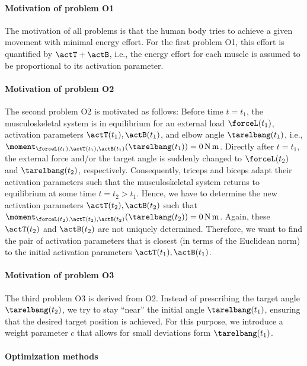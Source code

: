 \paragraph{Motivation of problem O1}

The motivation of all problems is that the human body tries to
achieve a given movement with minimal energy effort.
For the first problem O1, this effort is quantified by $\actT + \actB$,
i.e., the energy effort for each muscle is assumed to be proportional
to its activation parameter.

\paragraph{Motivation of problem O2}

The second problem O2 is motivated as follows:
Before time $t = t_1$, the musculoskeletal system is in equilibrium for
an external load $\forceL(t_1)$,
activation parameters $\actT(t_1), \actB(t_1)$, and
elbow angle $\tarelbang(t_1)$, i.e.,
$\moment_{\forceL(t_1),\actT(t_1),\actB(t_1)}(\tarelbang(t_1))
= \SI{0}{\newton\meter}$.
Directly after $t = t_1$,
the external force and/or the target angle is suddenly changed
to $\forceL(t_2)$ and $\tarelbang(t_2)$, respectively.
Consequently, triceps and biceps adapt their activation parameters
such that the musculoskeletal system returns to equilibrium
at some time $t = t_2 > t_1$.
Hence, we have to determine the new activation parameters
$\actT(t_2), \actB(t_2)$ such that
$\moment_{\forceL(t_2),\actT(t_2),\actB(t_2)}(\tarelbang(t_2))
= \SI{0}{\newton\meter}$.
Again, these $\actT(t_2)$ and $\actB(t_2)$ are not uniquely determined.
Therefore, we want to find the pair of activation parameters
that is closest (in terms of the Euclidean norm) to the initial
activation parameters $\actT(t_1), \actB(t_1)$.

\paragraph{Motivation of problem O3}

The third problem O3 is derived from O2.
Instead of prescribing the target angle $\tarelbang(t_2)$,
we try to stay ``near'' the initial angle $\tarelbang(t_1)$,
ensuring that the desired target position is achieved.
For this purpose, we introduce a weight parameter $c$ that
allows for small deviations form $\tarelbang(t_1)$.

\paragraph{Optimization methods}

